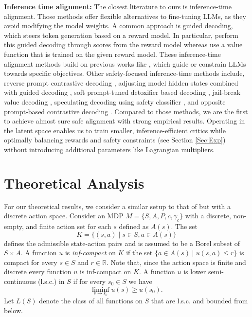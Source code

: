 \textbf{Inference time alignment:} The closest literature to ours is inference-time alignment. Those methods offer flexible alternatives to fine-tuning LLMs, as they avoid modifying the model weights. A common approach is guided decoding, which steers token generation based on a reward model. In particular, \citep{khanov2024args,shi2024decoding,huang2024deal} perform this guided decoding through scores from the reward model whereas \citet{han2024value,mudgal2023controlled,kong2024aligning} use a value function that is trained on the given reward model. These inference-time alignment methods build on previous works like \citep{yang2021fudge,arora2022director,krause2021gedi,kim2023critic,meng2022nado,peng2019awr}, which guide or constrain LLMs towards specific objectives. Other safety-focused inference-time methods include, reverse prompt contrastive decoding \citep{zhong2024rose}, adjusting model hidden states combined with guided decoding \citep{banerjee2024safeinfer}, soft prompt-tuned detoxifier based decoding \citep{niu2024parameter}, jail-break value decoding \citep{wang2024probing}, speculating decoding using safety classifier \citep{zeng2024root}, and opposite prompt-based contrastive decoding \citep{zhao2024adversarial}. Compared to those methods, we are the first to achieve almost sure safe alignment with strong empirical results. Operating in the latent space enables us to train smaller, inference-efficient critics while optimally balancing rewards and safety constraints (see Section \ref{Sec:Exp}) without introducing additional parameters like Lagrangian multipliers.
\section{Theoretical Analysis}\label{sec: saute-thm}

For our theoretical results, we consider a similar setup to that of \citet{sootla2022saute,hernandez1992discrete}  but with a discrete action space. Consider an MDP \( M = \{S, A, P, c, \gamma_c\} \) with a discrete, non-empty, and finite action set for each $s$ defined as \( A(s) \). The set
\[
K = \{(s, a) \mid s \in S, a \in A(s)\}
\]
defines the admissible state-action pairs and is assumed to be a Borel subset of \( S \times A \). A function \( u \) is \emph{inf-compact} on \( K \) if the set
$\{ a \in A(s) \mid u(s, a) \leq r \}$
is compact for every \( s \in S \) and \( r \in \mathbb{R} \).
Note that, since the action space is finite and discrete every function $u$ is inf-compact on $K$.  A function $u$ is lower semi-continuous (l.s.c.) in $S$ if for every $s_0 \in S$ we have
\[
\liminf_{s \to s_0} u(s) \geq u(s_0).
\] Let \( L(S) \) denote the class of all functions on \( S \) that are l.s.c. and bounded from below.


